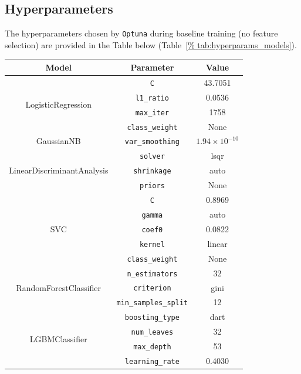 \documentclass[12pt]{article}
\begin{document}
\subsection{Hyperparameters}

The hyperparameters chosen by \texttt{Optuna} during baseline training (no
feature selection) are provided in the Table below (Table~\ref{%
tab:hyperparams_models}).

\begin{table}[H]
    \centering
    \begin{tabular}{|c|c|c|}
    \hline
    \textbf{Model} & \textbf{Parameter} & \textbf{Value} \\
    \hline
    \multirow{4}{*}{LogisticRegression}
      & \texttt{C} & 43.7051 \\
      & \texttt{l1\_ratio} & 0.0536 \\
      & \texttt{max\_iter} & 1758 \\
      & \texttt{class\_weight} & None \\
    \hline
    \multirow{1}{*}{GaussianNB}
      & \texttt{var\_smoothing} & $1.94 \times 10^{-10}$ \\
    \hline
    \multirow{3}{*}{LinearDiscriminantAnalysis}
      & \texttt{solver} & lsqr \\
      & \texttt{shrinkage} & auto \\
      & \texttt{priors} & None \\
    \hline
    \multirow{5}{*}{SVC}
      & \texttt{C} & 0.8969 \\
      & \texttt{gamma} & auto \\
      & \texttt{coef0} & 0.0822 \\
      & \texttt{kernel} & linear \\
      & \texttt{class\_weight} & None \\
    \hline
    \multirow{3}{*}{RandomForestClassifier}
      & \texttt{n\_estimators} & 32 \\
      & \texttt{criterion} & gini \\
      & \texttt{min\_samples\_split} & 12 \\
    \hline
    \multirow{10}{*}{LGBMClassifier}
      & \texttt{boosting\_type} & dart \\
      & \texttt{num\_leaves} & 32 \\
      & \texttt{max\_depth} & 53 \\
      & \texttt{learning\_rate} & 0.4030 \\

\end{tabular}
\end{table}
\end{document}
